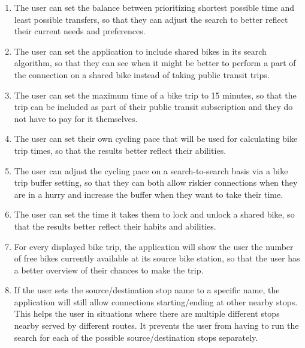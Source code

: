 \begin{enumerate}
\item The user can set the balance between prioritizing shortest possible time and least possible transfers, so that they can adjust the search to better reflect their current needs and preferences.
\label{req:comfort_balance}

\item The user can set the application to include shared bikes in its search algorithm, so that they can see when it might be better to perform a part of the connection on a shared bike instead of taking public transit trips.
\label{req:shared_bikes}

\item The user can set the maximum time of a bike trip to 15 minutes, so that the trip can be included as part of their public transit subscription and they do not have to pay for it themselves.
\label{req:bikes_max_15}

\item The user can set their own cycling pace that will be used for calculating bike trip times, so that the results better reflect their abilities.
\label{req:cycling_pace}

\item The user can adjust the cycling pace on a search-to-search basis via a bike trip buffer setting, so that they can both allow riskier connections when they are in a hurry and increase the buffer when they want to take their time.
\label{req:bike_trip_buffer}

\item The user can set the time it takes them to lock and unlock a shared bike, so that the results better reflect their habits and abilities.
\label{req:lock_unlock_time}

\item For every displayed bike trip, the application will show the user the number of free bikes currently available at its source bike station, so that the user has a better overview of their chances to make the trip.
\label{req:bike_count}

\item If the user sets the source/destination stop name to a specific name, the application will still allow connections starting/ending at other nearby stops. This helps the user in situations where there are multiple different stops nearby served by different routes. It prevents the user from having to run the search for each of the possible source/destination stops separately.
\label{req:multiple_src_dest}


\end{enumerate}

